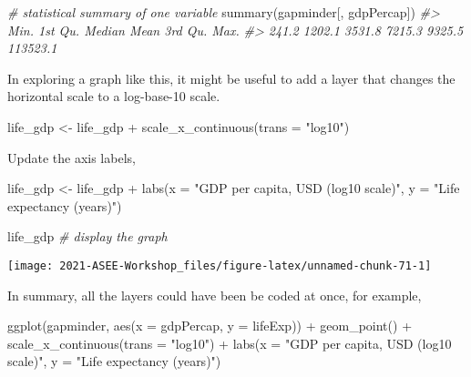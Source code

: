 \documentclass[
]{book}
\newenvironment{Shaded}{\begin{snugshade}}{\end{snugshade}}
\newcommand{\AttributeTok}[1]{\textcolor[rgb]{0.77,0.63,0.00}{#1}}
\newcommand{\CommentTok}[1]{\textcolor[rgb]{0.56,0.35,0.01}{\textit{#1}}}
\newcommand{\FunctionTok}[1]{\textcolor[rgb]{0.00,0.00,0.00}{#1}}
\newcommand{\NormalTok}[1]{#1}
\newcommand{\OtherTok}[1]{\textcolor[rgb]{0.56,0.35,0.01}{#1}}
\newcommand{\SpecialCharTok}[1]{\textcolor[rgb]{0.00,0.00,0.00}{#1}}
\newcommand{\StringTok}[1]{\textcolor[rgb]{0.31,0.60,0.02}{#1}}
\begin{document}
\begin{Shaded}
\begin{Highlighting}[]
\CommentTok{\# statistical summary of one variable }
\FunctionTok{summary}\NormalTok{(gapminder[, gdpPercap])}
\CommentTok{\#\textgreater{}     Min.  1st Qu.   Median     Mean  3rd Qu.     Max. }
\CommentTok{\#\textgreater{}    241.2   1202.1   3531.8   7215.3   9325.5 113523.1}
\end{Highlighting}
\end{Shaded}

In exploring a graph like this, it might be useful to add a layer that changes the horizontal scale to a log-base-10 scale.

\begin{Shaded}
\begin{Highlighting}[]
\NormalTok{life\_gdp }\OtherTok{\textless{}{-}}\NormalTok{ life\_gdp }\SpecialCharTok{+}
  \FunctionTok{scale\_x\_continuous}\NormalTok{(}\AttributeTok{trans =} \StringTok{"log10"}\NormalTok{) }
\end{Highlighting}
\end{Shaded}

Update the axis labels,

\begin{Shaded}
\begin{Highlighting}[]
\NormalTok{life\_gdp }\OtherTok{\textless{}{-}}\NormalTok{ life\_gdp }\SpecialCharTok{+}
  \FunctionTok{labs}\NormalTok{(}\AttributeTok{x =} \StringTok{"GDP per capita, USD (log10 scale)"}\NormalTok{, }
       \AttributeTok{y =} \StringTok{"Life expectancy (years)"}\NormalTok{)}

\NormalTok{life\_gdp }\CommentTok{\# display the graph}
\end{Highlighting}
\end{Shaded}

\texttt{[image: 2021-ASEE-Workshop\_files/figure-latex/unnamed-chunk-71-1]}

In summary, all the layers could have been be coded at once, for example,

\begin{Shaded}
\begin{Highlighting}[]
\FunctionTok{ggplot}\NormalTok{(gapminder, }\FunctionTok{aes}\NormalTok{(}\AttributeTok{x =}\NormalTok{ gdpPercap, }\AttributeTok{y =}\NormalTok{ lifeExp)) }\SpecialCharTok{+}
  \FunctionTok{geom\_point}\NormalTok{() }\SpecialCharTok{+}
  \FunctionTok{scale\_x\_continuous}\NormalTok{(}\AttributeTok{trans =} \StringTok{"log10"}\NormalTok{) }\SpecialCharTok{+}
  \FunctionTok{labs}\NormalTok{(}\AttributeTok{x =} \StringTok{"GDP per capita, USD (log10 scale)"}\NormalTok{, }
       \AttributeTok{y =} \StringTok{"Life expectancy (years)"}\NormalTok{)}
\end{Highlighting}
\end{Shaded}
\end{document}
